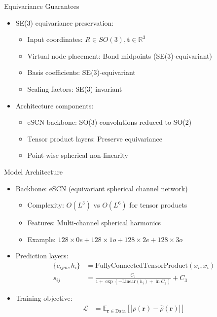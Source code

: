 \begin{frame}{Equivariance Guarantees}
    \begin{itemize}
        \item SE(3) equivariance preservation:
        \begin{itemize}
            \item Input coordinates: $R \in SO(3), \mathbf{t} \in \mathbb{R}^3$
            \item Virtual node placement: Bond midpoints (SE(3)-equivariant)
            \item Basis coefficients: SE(3)-equivariant
            \item Scaling factors: SE(3)-invariant
        \end{itemize}
        \item Architecture components:
        \begin{itemize}
            \item eSCN backbone: SO(3) convolutions reduced to SO(2)
            \item Tensor product layers: Preserve equivariance
            \item Point-wise spherical non-linearity
        \end{itemize}
    \end{itemize}
\end{frame}

\begin{frame}{Model Architecture}
    \begin{itemize}
        \item Backbone: eSCN (equivariant spherical channel network)
        \begin{itemize}
            \item Complexity: $O(L^3)$ vs $O(L^6)$ for tensor products
            \item Features: Multi-channel spherical harmonics
            \item Example: $128\times0e + 128\times1o + 128\times2e + 128\times3o$
        \end{itemize}
        \item Prediction layers:
        \begin{align*}
            \{c_{ijm}, h_i\} &= \text{FullyConnectedTensorProduct}(x_i, x_i) \\
            s_{ij} &= \frac{C_1}{1 + \exp(-\text{Linear}(h_i) + \ln C_2)} + C_3
        \end{align*}
        \item Training objective:
        \begin{align*}
            \mathcal{L} &= \mathbb{E}_{\mathbf{r}\in\text{Data}}[|\rho(\mathbf{r}) - \hat{\rho}(\mathbf{r})|]
        \end{align*}
    \end{itemize}
\end{frame}

